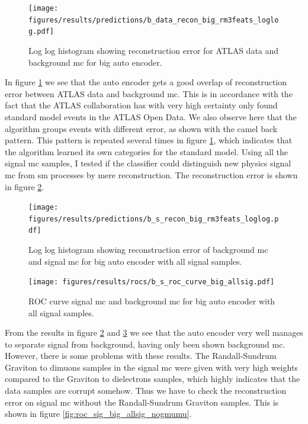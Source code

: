 \documentclass[ reprint, amsmath,amssymb, aps, nofootinbib]{revtex4-2}
\begin{document}
\begin{figure}[H]
     \centering
         \texttt{[image: figures/results/predictions/b\_data\_recon\_big\_rm3feats\_loglog.pdf]}
         \caption{Log log histogram showing reconstruction error for ATLAS data and background mc for big auto encoder. }
     \label{fig:data_b_big_pred}
\end{figure}

In figure \ref{fig:data_b_big_pred} we see that the auto encoder gets a good overlap of reconstruction error between ATLAS data and background mc. This is in accordance with the fact that the ATLAS collaboration has with very high certainty only found standard model events in the ATLAS Open Data. We also observe here that the algorithm groups events with different error, as shown with the camel back pattern. This pattern is repeated several times in figure \ref{fig:data_b_big_pred}, which indicates that the algorithm learned its own categories for the standard model. Using all the signal mc samples, I tested if the classifier could distinguish new physics signal mc from sm processes by mere reconstruction. The reconstruction error is shown in figure \ref{fig:s_b_big_pred_allsig}.


\begin{figure}[H]
     \centering
         \texttt{[image: figures/results/predictions/b\_s\_recon\_big\_rm3feats\_loglog.pdf]}
    \caption{Log log histogram showing reconstruction error of background mc and signal mc for big auto encoder with all signal samples.  }
    \label{fig:s_b_big_pred_allsig}
\end{figure}


\begin{figure}[H]    
    
    \centering
         \texttt{[image: figures/results/rocs/b\_s\_roc\_curve\_big\_allsig.pdf]}
         \caption{ROC curve signal mc and background mc for big auto encoder with all signal samples.}
         \label{fig:s_b_big_roc_allsig}
\end{figure}


From the results in figure \ref{fig:s_b_big_pred_allsig} and \ref{fig:s_b_big_roc_allsig} we see that the auto encoder very well manages to separate signal from background, having only been shown background mc. However, there is some problems with these results. The Randall-Sundrum Graviton to dimuons samples in the signal mc were given with very high weights compared to the Graviton to dielectrons samples, which highly indicates that the data samples are corrupt somehow. Thus we have to check the reconstruction error on signal mc without the Randall-Sundrum Graviton samples. This is shown in figure \ref{fig:roc_sig_big_allsig_nogmumu}.
\end{document}
